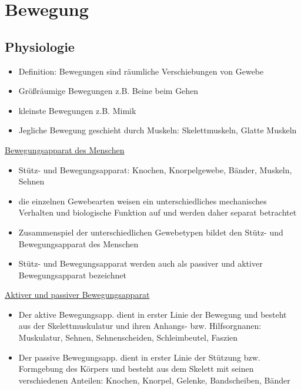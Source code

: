 \documentclass[a4paper,10pt,oneside]{article}
\begin{document}
\section{Bewegung}
\subsection{Physiologie}
 		
	\begin{itemize}
		\item Definition: Bewegungen sind räumliche Verschiebungen von Gewebe
		\item Größräumige Bewegungen z.B. Beine beim Gehen
		\item kleinste Bewegungen z.B. Mimik
		\item Jegliche Bewegung geschieht durch Muskeln: Skelettmuskeln, Glatte Muskeln
	\end{itemize}
	

\underline{Bewegungsapparat des Menschen} \\
	\begin{itemize}
		\item Stütz- und Bewegungsapparat: Knochen, Knorpelgewebe, Bänder, Muskeln, Sehnen
		\item die einzelnen Gewebearten weisen ein unterschiedliches mechanisches Verhalten und biologische Funktion auf und werden daher separat betrachtet
		\item Zusammenspiel der unterschiedlichen Gewebetypen bildet den Stütz- und Bewegungsapparat des Menschen
		\item Stütz- und Bewegungsapparat werden auch als passiver und aktiver Bewegungsapparat bezeichnet
	\end{itemize}
	

\underline{Aktiver und passiver Bewegungsapparat} \\
 	\begin{itemize}
 		\item Der aktive Bewegungsapp. dient in erster Linie der Bewegung und besteht aus der Skelettmuskulatur und ihren Anhangs- bzw. Hilfsorgnanen: Muskulatur, Sehnen, Sehnenscheiden, Schleimbeutel, Faszien
 		\item Der passive Bewegungsapp. dient in erster Linie der Stützung bzw. Formgebung des Körpers und besteht aus dem Skelett mit seinen verschiedenen Anteilen: Knochen, Knorpel, Gelenke, Bandscheiben, Bänder
 	\end{itemize}
 
\end{document}
